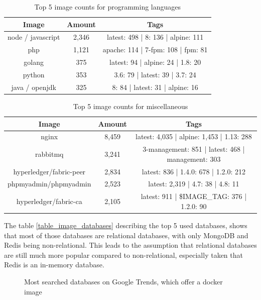 \begin{table}[h!]
    \centering
    \begin{tabular}{ |c|c|c| }
    \hline
    Image & Amount & Tags \\
    \hline
         node / javascript & 2,346 & latest: 498 | 8: 136 | alpine: 111\\
         php & 1,121 & apache: 114 | 7-fpm: 108 | fpm: 81 \\
         golang & 375 & latest: 94 | alpine: 24 | 1.8: 20 \\
         python & 353 & 3.6: 79 | latest: 39 | 3.7: 24\\
         java / openjdk & 325 & 8: 84 | latest: 31 | alpine: 16\\
    \hline
    \end{tabular}
    \caption{Top 5 image counts for programming languages}
    \label{table_image_languages}
\end{table}

\begin{table}[h!]
    \centering
    \begin{tabular}{ |c|c|c| }
    \hline
    Image & Amount & Tags \\
    \hline
         nginx & 8,459 & latest: 4,035 | alpine: 1,453 | 1.13: 288\\
         rabbitmq & 3,241 & 3-management: 851 | latest: 468 | management: 303\\
         hyperledger/fabric-peer & 2,834 & latest: 836 | 1.4.0: 678 | 1.2.0: 212\\
         phpmyadmin/phpmyadmin & 2,523 & latest: 2,319 | 4.7: 38 | 4.8: 11 \\
         hyperledger/fabric-ca & 2,105 & latest: 911 | \$IMAGE\_TAG: 376 | 1.2.0: 90\\
    \hline
    \end{tabular}
    \caption{Top 5 image counts for miscellaneous}
    \label{table_image_misc}
\end{table}

The table \ref{table_image_databases} describing the top 5 used databases, shows that most of those databases are relational databases, with only MongoDB and Redis being non-relational. This leads to the assumption that relational databases are still much more popular compared to non-relational, especially taken that Redis is an in-memory database.

\begin{figure}[H]
    \centering
    \def\stackalignment{r}
    \caption{Most searched databases on Google Trends, which offer a docker image}
    \label{fig:databases_top_ranking}
\end{figure}

